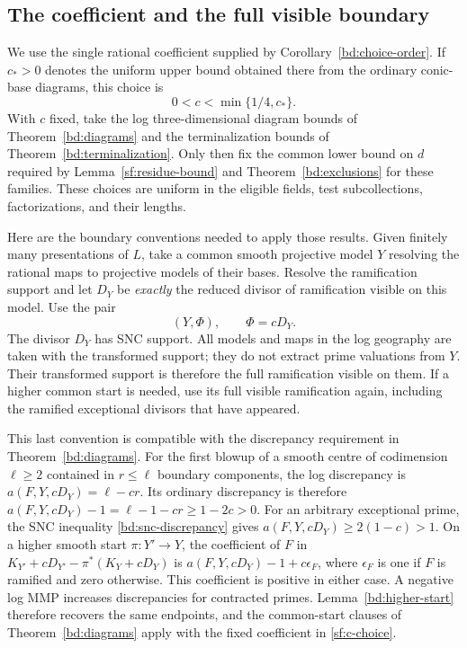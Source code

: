 \subsection{The coefficient and the full visible boundary}

We use the single rational coefficient supplied by
Corollary~\ref{bd:choice-order}.  If $c_*>0$ denotes the uniform upper
bound obtained there from the ordinary conic-base diagrams, this choice is
\begin{equation}\label{sf:c-choice}
                  0<c<\min\{1/4,c_*\}.
\end{equation}
With $c$ fixed, take the log three-dimensional diagram bounds of
Theorem~\ref{bd:diagrams} and the terminalization bounds of
Theorem~\ref{bd:terminalization}.  Only then fix the common lower bound
on $d$ required by Lemma~\ref{sf:residue-bound} and
Theorem~\ref{bd:exclusions} for these families.  These choices are
uniform in the eligible fields, test subcollections, factorizations,
and their lengths.

Here are the boundary conventions needed to apply those results.
Given finitely many presentations of $L$, take a common smooth
projective model $Y$ resolving the rational maps to projective models
of their bases.  Resolve the ramification support and let $D_Y$ be
\emph{exactly} the reduced divisor of ramification visible on this
model.  Use the pair
\begin{equation}\label{sf:start}
                         (Y,\Phi),\qquad \Phi=cD_Y.
\end{equation}
The divisor $D_Y$ has SNC support.  All models and maps in the log
geography are taken with the transformed support; they do not extract
prime valuations from $Y$.  Their transformed support is therefore
the full ramification visible on them.  If a higher common start is
needed, use its full visible ramification again, including the
ramified exceptional divisors that have appeared.

This last convention is compatible with the discrepancy requirement
in Theorem~\ref{bd:diagrams}.  For the first blowup of a smooth centre
of codimension $\ell\geq2$ contained in $r\leq\ell$ boundary components,
the log discrepancy is $a(F,Y,cD_Y)=\ell-cr$.  Its ordinary discrepancy
is therefore $a(F,Y,cD_Y)-1=\ell-1-cr\geq1-2c>0$.
For an arbitrary exceptional prime, the SNC inequality
\eqref{bd:snc-discrepancy} gives $a(F,Y,cD_Y)\geq2(1-c)>1$.
On a higher smooth start $\pi:Y'\to Y$, the coefficient of $F$ in
$K_{Y'}+cD_{Y'}-\pi^*(K_Y+cD_Y)$ is
$a(F,Y,cD_Y)-1+c\epsilon_F$, where $\epsilon_F$ is one if $F$ is
ramified and zero otherwise.  This coefficient is positive in either
case.  A negative log MMP increases discrepancies for contracted primes.
Lemma~\ref{bd:higher-start} therefore recovers the same endpoints, and
the common-start clauses of Theorem~\ref{bd:diagrams} apply with the
fixed coefficient in \eqref{sf:c-choice}.


